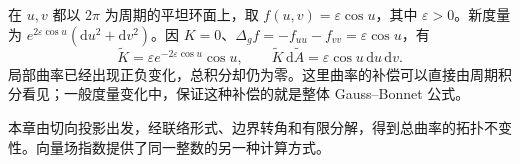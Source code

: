 \begin{example}
	\label{g1:exm:conformal-flat-torus}
	在 \(u,v\) 都以 \(2\pi\) 为周期的平坦环面上，取 \(f(u,v)=\varepsilon\cos u\)，其中 \(\varepsilon>0\)。新度量为 \(e^{2\varepsilon\cos u}(\mathrm{d}u^2+\mathrm{d}v^2)\)。因 \(K=0\)、\(\Delta_g f=-f_{uu}-f_{vv}=\varepsilon\cos u\)，有
	\[
		\widetilde K=\varepsilon e^{-2\varepsilon\cos u}\cos u,\qquad
		\widetilde K\,\mathrm{d}\widetilde A=\varepsilon\cos u\,\mathrm{d}u\,\mathrm{d}v.
	\]
	局部曲率已经出现正负变化，总积分却仍为零。这里曲率的补偿可以直接由周期积分看见；一般度量变化中，保证这种补偿的就是整体 Gauss--Bonnet 公式。
\end{example}

本章由切向投影出发，经联络形式、边界转角和有限分解，得到总曲率的拓扑不变性。向量场指数提供了同一整数的另一种计算方式。

